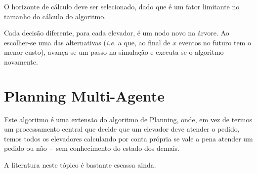 O horizonte de cálculo deve ser selecionado, dado que é um fator limitante no
tamanho do cálculo do algoritmo.

Cada decisão diferente, para cada elevador, é um nodo novo na árvore. Ao
escolher-se uma das alternativas (\textit{i.e.} a que, ao final de $x$ eventos
no futuro tem o menor custo), avança-se um passo na simulação e executa-se o
algoritmo novamente.

\section{Planning Multi-Agente}

Este algoritmo é uma extensão do algoritmo de Planning, onde, em vez de termos
um processamento central que decide que um elevador deve atender o pedido, temos
todos os elevadores calculando por conta própria se vale a pena atender um
pedido ou não~-~sem conhecimento do estado dos demais.

A literatura neste tópico é bastante escassa ainda.